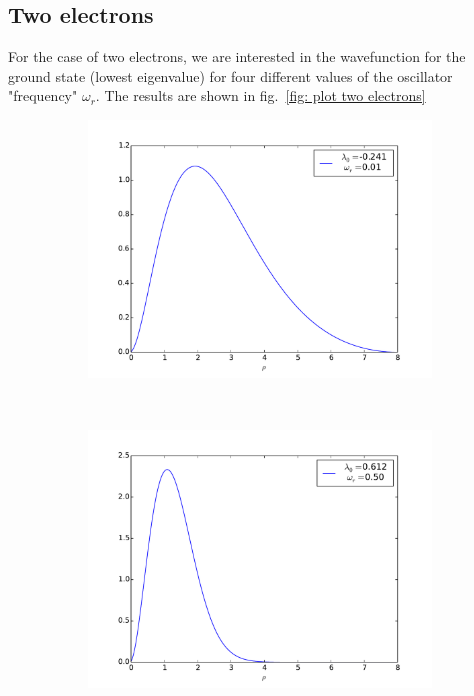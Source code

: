 \documentclass[11pt, a4paper]{article}
\begin{document}
		\subsection{Two electrons}
			For the case of two electrons, we are interested in the wavefunction for the ground state (lowest eigenvalue) for four different values of the oscillator "frequency" $\omega_r$. The results are shown in fig.~\ref{fig: plot two electrons}
			\begin{figure}
				\centering
   				\begin{subfigure}[b]{0.45\textwidth}
					\includegraphics[width=1.1\textwidth]{plot-twoElectrons_01}
					\label{fig:gull}
				\end{subfigure}
				~ %
				\begin{subfigure}[b]{0.45\textwidth}
					\includegraphics[width=1.1\textwidth]{plot-twoElectrons_05}

\end{subfigure}
\end{figure}
\end{document}
